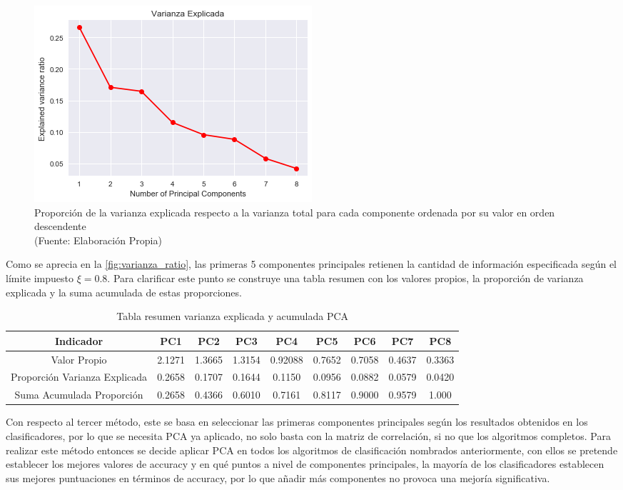 \begin{figure}[ht!]
\centering
\includegraphics[width=.6\textwidth]{figures/varianza_ratio.png}
\caption[Proporción de la varianza explicada PCA]{Proporción de la varianza explicada respecto a la varianza total para cada componente ordenada por su valor en orden descendente  \\
{\scriptsize (Fuente: Elaboración Propia)}}
\label{fig:varianza_ratio}
\end{figure}

Como se aprecia en la \autoref{fig:varianza_ratio}, las primeras 5 componentes principales retienen la cantidad de información especificada según el límite impuesto $\xi =0.8$. Para clarificar este punto se construye una tabla resumen con los valores propios, la proporción de varianza explicada y la suma acumulada de estas proporciones.

\begin{table}[ht!]
\centering
\caption[Tabla resumen varianza explicada y acumulada PCA]{Tabla resumen varianza explicada y acumulada PCA}
\label{my-label}
\begin{tabular}{|c|c|c|c|c|c|c|c|c|}
\hline
Indicador                     & PC1    & PC2    & PC3    & PC4     & PC5    & PC6    & PC7    & PC8    \\ \hline
Valor Propio                  & 2.1271 & 1.3665 & 1.3154 & 0.92088 & 0.7652 & 0.7058 & 0.4637 & 0.3363 \\ \hline
Proporción Varianza Explicada & 0.2658 & 0.1707 & 0.1644 & 0.1150  & 0.0956 & 0.0882 & 0.0579 & 0.0420 \\ \hline
Suma Acumulada Proporción     & 0.2658 & 0.4366 & 0.6010 & 0.7161  & 0.8117 & 0.9000 & 0.9579 & 1.000  \\ \hline
\end{tabular}
\end{table}

Con respecto al tercer método, este se basa en seleccionar las primeras componentes principales según los resultados obtenidos en los clasificadores, por lo que se necesita PCA ya aplicado, no solo basta con la matriz de correlación, si no que los algoritmos completos. Para realizar este método entonces se decide aplicar PCA en todos los algoritmos de clasificación nombrados anteriormente, con ellos se pretende establecer los mejores valores de accuracy y en qué puntos a nivel de componentes principales, la mayoría de los clasificadores establecen sus mejores puntuaciones en términos de accuracy, por lo que añadir más componentes no provoca una mejoría significativa.

